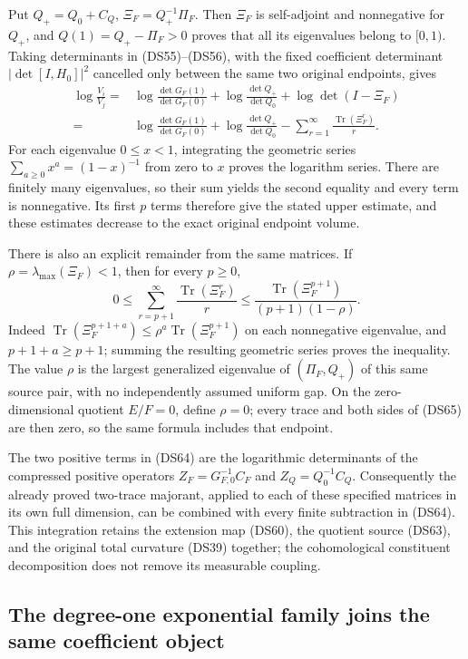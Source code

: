 Put $Q_+=Q_0+C_Q$, $\Xi_F=Q_+^{-1}\Pi_F$.  Then $\Xi_F$ is
self-adjoint and nonnegative for $Q_+$, and
$Q(1)=Q_+-\Pi_F>0$ proves that all its eigenvalues belong to
$[0,1)$.  Taking determinants in (DS55)--(DS56), with the fixed
coefficient determinant $|\det[I,H_0]|^2$ cancelled only between
the same two original endpoints, gives
\[
\begin{split}
 \log\frac{V_i}{V_j}
 ={}&\log\frac{\det G_F(1)}{\det G_F(0)}
   +\log\frac{\det Q_+}{\det Q_0}
   +\log\det(I-\Xi_F)\\
 ={}&\log\frac{\det G_F(1)}{\det G_F(0)}
   +\log\frac{\det Q_+}{\det Q_0}
   -\sum_{r=1}^\infty\frac{\operatorname{Tr}(\Xi_F^r)}r.
\end{split}\tag{DS64}
\]
For each eigenvalue $0\leq x<1$, integrating the geometric series
$\sum_{a\geq0}x^a=(1-x)^{-1}$ from zero to $x$ proves the
logarithm series.  There are finitely many eigenvalues, so their
sum yields the second equality and every term is nonnegative.
Its first $p$ terms therefore give the stated upper estimate, and
these estimates decrease to the exact original endpoint volume.

There is also an explicit remainder from the same matrices.  If
$\rho=\lambda_{\max}(\Xi_F)<1$, then for every $p\geq0$,
\[
 0\leq
 \sum_{r=p+1}^\infty\frac{\operatorname{Tr}(\Xi_F^r)}r
 \leq\frac{\operatorname{Tr}(\Xi_F^{p+1})}{(p+1)(1-\rho)}.
 \tag{DS65}
\]
Indeed $\operatorname{Tr}(\Xi_F^{p+1+a})
\leq\rho^a\operatorname{Tr}(\Xi_F^{p+1})$ on each nonnegative
eigenvalue, and $p+1+a\geq p+1$; summing the resulting geometric
series proves the inequality.  The value $\rho$ is the largest
generalized eigenvalue of $(\Pi_F,Q_+)$ of this same source pair,
with no independently assumed uniform gap.  On the zero-dimensional
quotient $E/F=0$, define $\rho=0$; every trace and both sides of
(DS65) are then zero, so the same formula includes that endpoint.

The two positive terms in (DS64) are the logarithmic determinants
of the compressed positive operators
$Z_F=G_{F,0}^{-1}C_F$ and $Z_Q=Q_0^{-1}C_Q$.
Consequently the already proved two-trace majorant, applied to
each of these specified matrices in its own full dimension, can
be combined with every finite subtraction in (DS64).  This
integration retains the extension map (DS60), the quotient source
(DS63), and the original total curvature (DS39) together; the
cohomological constituent decomposition does not remove its
measurable coupling.

\subsection{The degree-one exponential family joins the same coefficient object}

